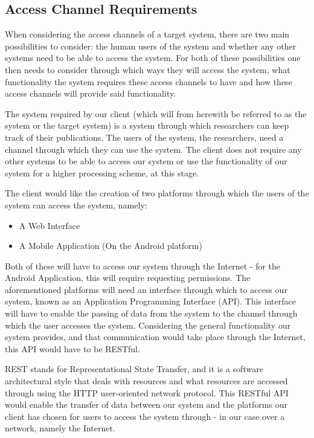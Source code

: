 \documentclass[a4paper,12pt]{article}
\begin{document}
\subsection{Access Channel Requirements}

When considering the access channels of a target system, there are two main possibilities to consider: the human users of the system and whether any other systems need to be able to access the system. For both of these possibilities one then needs to consider through which ways they will access the system, what functionality the system requires these access channels to have and how these access channels will provide said functionality. 

The system required by our client (which will from herewith be referred to as the system or the target system) is a system through which researchers can keep track of their publications. The users of the system, the researchers, need a channel through which they can use the system. The client does not require any other systems to be able to access our system or use the functionality of our system for a higher processing scheme, at this stage.

The client would like the creation of two platforms through which the users of the system can access the system, namely:
\begin{itemize}
	\item A Web Interface
	\item A Mobile Application (On the Android platform)
\end{itemize}

Both of these will have to access our system through the Internet - for the Android Application, this will require requesting permissions. The aforementioned platforms will need an interface through which to access our system, known as an Application Programming Interface (API). This interface will have to enable the passing of data from the system to the channel through which the user accesses the system. Considering the general functionality our system provides, and that communication would take place through the Internet, this API would have to be RESTful.

REST stands for Representational State Transfer, and it is a software architectural style that deals with resources and what resources are accessed through using the HTTP user-oriented network protocol. This RESTful API would enable the transfer of data between our system and the platforms our client has chosen for users to access the system through - in our case over a network, namely the Internet.
\end{document}

